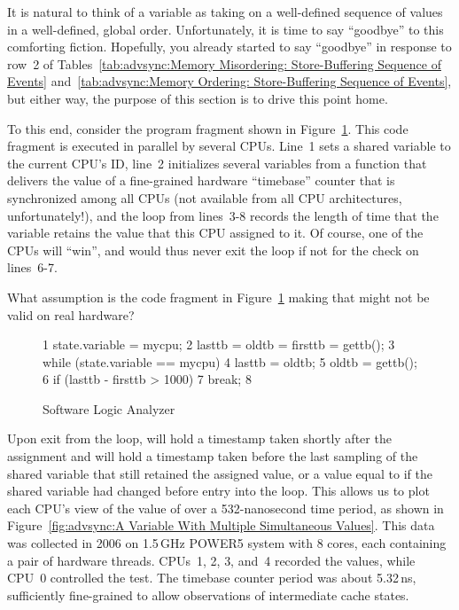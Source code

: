 It is natural to think of a variable as taking on a well-defined
sequence of values in a well-defined, global order.
Unfortunately, it is time to say ``goodbye'' to this comforting fiction.
Hopefully, you already started to say ``goodbye'' in response to row~2 of
Tables~\ref{tab:advsync:Memory Misordering: Store-Buffering Sequence of Events}
and~\ref{tab:advsync:Memory Ordering: Store-Buffering Sequence of Events},
but either way, the purpose of this section is to drive this point home.

To this end, consider the program fragment shown in
Figure~\ref{fig:advsync:Software Logic Analyzer}.
This code fragment is executed in parallel by several CPUs.
Line~1 sets a shared variable to the current CPU's ID, line~2
initializes several variables from a  function that
delivers the value of a fine-grained hardware ``timebase'' counter that is
synchronized among all CPUs (not available from all CPU architectures,
unfortunately!), and the loop from lines~3-8 records the length of
time that the variable retains the value that this CPU assigned to it.
Of course, one of the CPUs will ``win'', and would thus never exit
the loop if not for the check on lines~6-7.

\QuickQuiz{}
	What assumption is the code fragment
	in Figure~\ref{fig:advsync:Software Logic Analyzer}
	making that might not be valid on real hardware?
 \QuickQuizEnd

\begin{figure}[tbp]
{ \scriptsize
\begin{verbbox}
  1 state.variable = mycpu;
  2 lasttb = oldtb = firsttb = gettb();
  3 while (state.variable == mycpu) {
  4   lasttb = oldtb;
  5   oldtb = gettb();
  6   if (lasttb - firsttb > 1000)
  7     break;
  8 }
\end{verbbox}
}
\centering
\theverbbox
\caption{Software Logic Analyzer}
\label{fig:advsync:Software Logic Analyzer}
\end{figure}

Upon exit from the loop,  will hold a timestamp
taken shortly after the assignment and  will hold
a timestamp taken before the last sampling of the shared variable
that still retained the assigned value, or a value equal to 
if the shared variable had changed before entry into the loop.
This allows us to plot each CPU's view of the value of 
over a 532-nanosecond time period, as shown in
Figure~\ref{fig:advsync:A Variable With Multiple Simultaneous Values}.
This data was collected in 2006 on 1.5\,GHz POWER5 system with 8 cores,
each containing a pair of hardware threads.
CPUs~1, 2, 3, and~4 recorded the values, while CPU~0 controlled the test.
The timebase counter period was about 5.32\,ns, sufficiently fine-grained
to allow observations of intermediate cache states.

